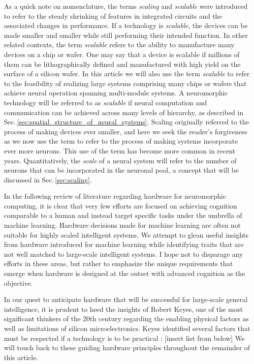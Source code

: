 As a quick note on nomenclature, the terms \textit{scaling} and \textit{scalable} were introduced to refer to the steady shrinking of features in integrated circuits and the associated changes in performance. If a technology is \textit{scalable}, the devices can be made smaller and smaller while still performing their intended function. In other related contexts, the term \textit{scalable} refers to the ability to manufacture many devices on a chip or wafer. One may say that a device is scalable if millions of them can be lithographically defined and manufactured with high yield on the surface of a silicon wafer. In this article we will also use the term \textit{scalable} to refer to the feasibility of realizing large systems comprising many chips or wafers that achieve neural operation spanning multi-module systems. A neuromorphic technology will be referred to as \textit{scalable} if neural computation and communication can be achieved across many levels of hierarchy, as described in Sec.\,\ref{sec:spatial_structure_of_neural_systems}. Scaling originally referred to the process of making devices ever smaller, and here we seek the reader's forgiveness as we now use the term to refer to the process of making systems incorporate ever more neurons. This use of the term has become more common in recent years. Quantitatively, the \textit{scale} of a neural system will refer to the number of neurons that can be incorporated in the neuronal pool, a concept that will be discussed in Sec.\,\ref{sec:scaling}.

In the following review of literature regarding hardware for neuromorphic computing, it is clear that very few efforts are focused on achieving cognition comparable to a human and instead target specific tasks under the umbrella of machine learning. Hardware decisions made for machine learning are often not suitable for highly scaled intelligent systems. We attempt to glean useful insights from hardware introduced for machine learning while identifying traits that are not well matched to large-scale intelligent systems. I hope not to disparage any efforts in these areas, but rather to emphasize the unique requirements that emerge when hardware is designed at the outset with advanced cognition as the objective.

In our quest to anticipate hardware that will be successful for large-scale general intelligence, it is prudent to heed the insights of Robert Keyes, one of the most significant thinkers of the 20th century regarding the enabling physical factors as well as limitations of silicon microelectronics. Keyes identified several factors that must be respected if a technology is to be practical \cite{ke1985a,ke1985b}: [insert list from below] We will touch back to these guiding hardware principles throughout the remainder of this article.


